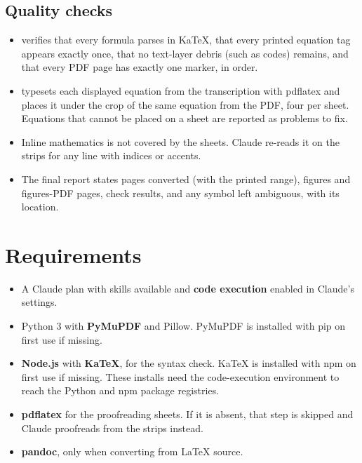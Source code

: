 \documentclass[11pt,a4paper]{article}
\begin{document}
\subsection{Quality checks}\label{sec:checks}
\begin{itemize}
\item {} verifies that every formula parses in KaTeX, that every printed equation
  tag appears exactly once, that no text-layer debris (such as  codes) remains,
  and that every PDF page has exactly one marker, in order.
\item {} typesets each displayed equation from the transcription with
  pdflatex and places it under the crop of the same equation from the PDF, four per sheet.
  Equations that cannot be placed on a sheet are reported as problems to fix.
\item Inline mathematics is not covered by the sheets. Claude re-reads it on the strips for
  any line with indices or accents.
\item The final report states pages converted (with the printed range), figures and
  figures-PDF pages, check results, and any symbol left ambiguous, with its location.
\end{itemize}

\section{Requirements}
\begin{itemize}
\item A Claude plan with skills available and \textbf{code execution} enabled in Claude's settings.
\item Python 3 with \textbf{PyMuPDF} and Pillow. PyMuPDF is installed with pip on first use if missing.
\item \textbf{Node.js} with \textbf{KaTeX}, for the syntax check. KaTeX is installed with npm
  on first use if missing. These installs need the code-execution environment to reach the
  Python and npm package registries.
\item \textbf{pdflatex} for the proofreading sheets. If it is absent, that step is skipped and
  Claude proofreads from the strips instead.
\item \textbf{pandoc}, only when converting from LaTeX source.
\end{itemize}

\end{document}
